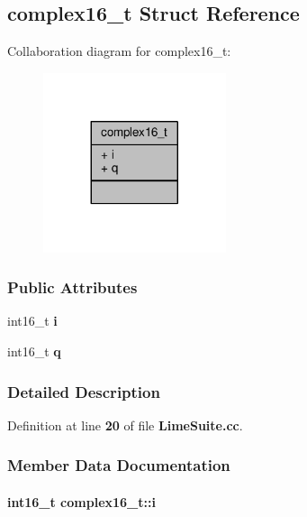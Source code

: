 \subsection{complex16\+\_\+t Struct Reference}
\label{structcomplex16__t}


Collaboration diagram for complex16\+\_\+t\+:
\nopagebreak
\begin{figure}[H]
\begin{center}
\leavevmode
\includegraphics[width=152pt]{db/d98/structcomplex16__t__coll__graph}
\end{center}
\end{figure}
\subsubsection*{Public Attributes}
\begin{DoxyCompactItemize}
\item 
int16\+\_\+t {\bf i}
\item 
int16\+\_\+t {\bf q}
\end{DoxyCompactItemize}


\subsubsection{Detailed Description}


Definition at line {\bf 20} of file {\bf Lime\+Suite.\+cc}.



\subsubsection{Member Data Documentation}
\paragraph[{i}]{\setlength{\rightskip}{0pt plus 5cm}int16\+\_\+t complex16\+\_\+t\+::i}\label{structcomplex16__t_aae65f8101bb1b2e6b985ee28dfe889eb}


